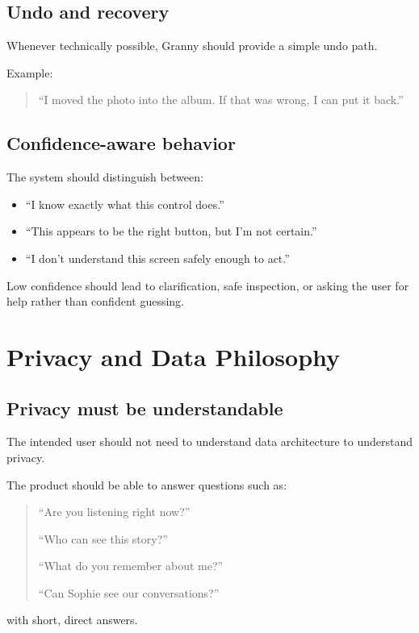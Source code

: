 \documentclass[11pt]{article}
\begin{document}
\subsection{Undo and recovery}
Whenever technically possible, Granny should provide a simple undo path.

Example:

\begin{quote}
``I moved the photo into the album. If that was wrong, I can put it back.''
\end{quote}

\subsection{Confidence-aware behavior}
The system should distinguish between:

\begin{itemize}[leftmargin=*]
    \item ``I know exactly what this control does.''
    \item ``This appears to be the right button, but I'm not certain.''
    \item ``I don't understand this screen safely enough to act.''
\end{itemize}

Low confidence should lead to clarification, safe inspection, or asking the user for help rather than confident guessing.

\section{Privacy and Data Philosophy}

\subsection{Privacy must be understandable}
The intended user should not need to understand data architecture to understand privacy.

The product should be able to answer questions such as:

\begin{quote}
``Are you listening right now?''

``Who can see this story?''

``What do you remember about me?''

``Can Sophie see our conversations?''
\end{quote}

with short, direct answers.
\end{document}
